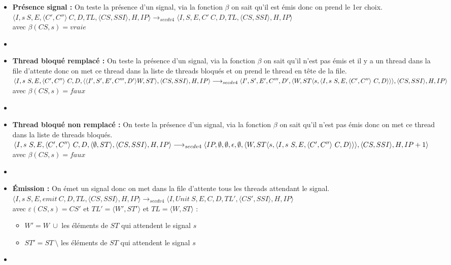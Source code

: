 \documentclass[10pt,a4paper]{article}
\begin{document}
\begin{enumerate}
\begin{itemize}
						\item[] \textbf{Présence signal :} On teste la présence d'un signal, via la fonction $\beta$ on sait qu'il est émis donc on prend le 1er choix.
						\smallbreak
						$\langle I,s~S,E,\langle C',C''\rangle~C,D,TL,\langle CS,SSI\rangle,H,IP\rangle 
						\longrightarrow_{secdv4} \langle I,S,E,C'~C,D,TL,\langle CS,SSI\rangle,H,IP\rangle$ \\
						avec $\beta(CS,s) = vraie$
						\item[]
							
							
						\item[] \textbf{Thread bloqué remplacé :} On teste la présence d'un signal, via la fonction $\beta$ on sait qu'il n'est pas émis et il y a un thread dans la file d'attente
						donc on met ce thread dans la liste de threads bloqués et on prend le thread en tête de la file.
						\smallbreak
						$\langle I,s~S,E,\langle C',C''\rangle~C,D,\langle\langle I',S',E',C''',D'\rangle W,ST\rangle,\langle CS,SSI\rangle,H,IP\rangle 
						\\\longrightarrow_{secdv4} \langle I',S',E',C''',D',\langle W,ST\langle s,\langle I,s~S,E,\langle C',C''\rangle~C,D\rangle\rangle\rangle,\langle CS,SSI\rangle,H,IP\rangle$ \\
						avec $\beta(CS,s) = faux$
						\item[]	
							
						\item[] \textbf{Thread bloqué non remplacé :} On teste la présence d'un signal, via la fonction $\beta$ on sait qu'il n'est pas émis donc on met ce thread dans la liste de threads bloqués.
						\smallbreak 
						$\langle I,s~S,E,\langle C',C''\rangle~C,D,\langle \emptyset,ST\rangle,\langle CS,SSI\rangle,H,IP\rangle 
						\\\longrightarrow_{secdv4} \langle IP,\emptyset,\emptyset,\epsilon,\emptyset,\langle W,ST\langle s,\langle I,s~S,E,\langle C',C''\rangle~C,D\rangle\rangle\rangle,\langle CS,SSI\rangle,H,IP+1\rangle$ \\
						avec $\beta(CS,s) = faux$
						\item[]	
						\newpage
						
						
						
						\item[] \textbf{Émission :} On émet un signal donc on met dans la file d'attente tous les threads attendant le signal.
						\smallbreak
						$\langle I,s~S,E,emit~C,D,TL,\langle CS,SSI\rangle,H,IP\rangle 
						\longrightarrow_{secdv4} \langle I,Unit~S,E,C,D,TL',\langle CS',SSI\rangle,H,IP\rangle$\\
						avec $\varepsilon(CS,s) = CS'$ et $TL' = \langle W',ST'\rangle$ et $TL = \langle W,ST\rangle$ :
						\begin{itemize}
							\item[] $W' = W~\cup$ les éléments de $ST$ qui attendent le signal $s$ 
							\item[] $ST' = ST~\setminus$ les éléments de $ST$ qui attendent le signal $s$ 
						\end{itemize}
						\item[]
						

\end{itemize}
\end{enumerate}
\end{document}

